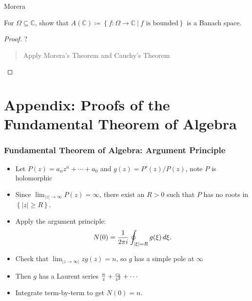 
Morera

\begin{proposition}

For \(\Omega\subseteq{\mathbb{C}}\), show that
\(A({\mathbb{C}})\coloneqq\left\{{f: \Omega \to {\mathbb{C}}{~\mathrel{\Big|}~}f\text{ is bounded}}\right\}\)
is a Banach space.

\end{proposition}

\begin{proof}

?

\begin{quote}
Apply Morera's Theorem and Cauchy's Theorem
\end{quote}

\end{proof}

\hypertarget{appendix-proofs-of-the-fundamental-theorem-of-algebra}{%
\section{Appendix: Proofs of the Fundamental Theorem of
Algebra}\label{appendix-proofs-of-the-fundamental-theorem-of-algebra}}

\hypertarget{fundamental-theorem-of-algebra-argument-principle}{%
\subsubsection{Fundamental Theorem of Algebra: Argument
Principle}\label{fundamental-theorem-of-algebra-argument-principle}}

\begin{itemize}
\tightlist
\item
  Let \(P(z) = a_nz^n + \cdots + a_0\) and \(g(z) = P'(z)/P(z)\), note
  \(P\) is holomorphic
\item
  Since
  \(\lim_{{\left\lvert {z} \right\rvert} \to \infty} P(z) = \infty\),
  there exist an \(R>0\) such that \(P\) has no roots in
  \(\left\{{{\left\lvert {z} \right\rvert} \geq R}\right\}\).
\item
  Apply the argument principle:
  \begin{align*}     N(0) = {1\over 2\pi i} \oint_{{\left\lvert {\xi} \right\rvert} = R} g(\xi) \,d\xi     .\end{align*}
\item
  Check that
  \(\lim_{{\left\lvert {z\to \infty} \right\rvert}}zg(z) = n\), so \(g\)
  has a simple pole at \(\infty\)
\item
  Then \(g\) has a Laurent series
  \({n\over z} + {c_2 \over z^2} + \cdots\)
\item
  Integrate term-by-term to get \(N(0) = n\).
\end{itemize}

